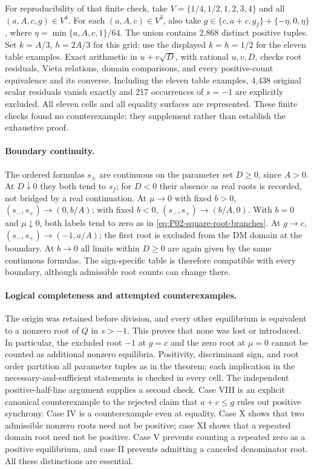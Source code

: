 For reproducibility of that finite check, take
$V=\{1/4,1/2,1,2,3,4\}$ and all $(a,A,c,g)\in V^4$.
For each $(a,A,c)\in V^3$, also take
$g\in\{c,a+c,g_f\}+\{-\eta,0,\eta\}$, where
$\eta=\min\{a,A,c,1\}/64$. The union contains 2,868 distinct
positive tuples. Set $k=A/3$, $h=2A/3$ for this grid; use the
displayed $k=h=1/2$ for the eleven table examples. Exact arithmetic
in $u+v\sqrt D$, with rational $u,v,D$, checks root residuals,
Vieta relations, domain comparisons, and every positive-count
equivalence and its converse. Including the eleven table examples,
4,438 original scalar residuals vanish exactly and 217 occurrences
of $s=-1$ are explicitly excluded. All eleven cells and all equality
surfaces are represented. These finite checks found no counterexample;
they supplement rather than establish the exhaustive proof.

\paragraph{Boundary continuity.}
The ordered formulas $s_\pm$ are continuous on the parameter set
$D\ge0$, since $A>0$. At $D\downarrow0$ they both tend to $s_f$;
for $D<0$ their absence as real roots is recorded, not bridged by
a real continuation. At $\mu\to0$ with fixed $b>0$,
$(s_-,s_+)\to(0,b/A)$; with fixed $b<0$,
$(s_-,s_+)\to(b/A,0)$. With $b=0$ and $\mu\downarrow0$, both labels
tend to zero as in \eqref{eq:P02-square-root-branches}. At $g\to c$,
$(s_-,s_+)\to(-1,a/A)$; the first root is excluded from the DM domain
at the boundary.
At $b\to0$ all limits within $D\ge0$ are again given by the same
continuous formulas. The sign-specific table is therefore compatible
with every boundary, although admissible root counts can change there.

\clearpage
\paragraph{Logical completeness and attempted counterexamples.}
The origin was retained before division, and every other equilibrium
is equivalent to a nonzero root of $Q$ in $s>-1$. This proves that
none was lost or introduced. In particular, the excluded root $-1$
at $g=c$ and the zero root at $\mu=0$ cannot be counted as additional
nonzero equilibria. Positivity, discriminant sign, and root order
partition all parameter tuples as in the theorem; each implication
in the necessary-and-sufficient statements is checked in every cell.
The independent positive-half-line argument supplies a second check.
Case VIII is an explicit canonical counterexample to the rejected
claim that $a+c\le g$ rules out positive synchrony. Case IV is a
counterexample even at equality. Case X shows that two admissible
nonzero roots need not be positive; case XI shows that a repeated
domain root need not be positive. Case V prevents counting a repeated
zero as a positive equilibrium, and case II prevents admitting a
canceled denominator root. All these distinctions are essential.
